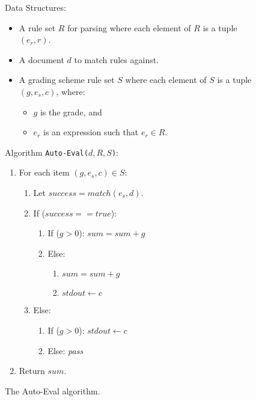 \begin{figure}[tr]
\begin{framed}
Data Structures:
\begin{itemize}
  \item A rule set $R$ for parsing where each element of $R$ is a tuple $(e_r, r)$.
  \item A document $d$ to match rules against.
  \item A grading scheme rule set $S$ where each element of $S$ is a tuple $(g, e_s, c)$, where:
    \begin{itemize}
      \item $g$ is the grade, and
      \item $e_r$ is an expression such that $e_r \in R$.
    \end{itemize}
\end{itemize}

Algorithm \texttt{Auto-Eval($d, R, S$)}:
\begin{enumerate}
 \item For each item $(g, e_s, c) \in S$:
  \begin{enumerate}
    \item Let $success = match(e_s, d)$.
    \item If ($success == true$):
    \begin{enumerate}
      \item If ($g > 0$): $sum = sum + g$
      \item Else: 
	\begin{enumerate}
	  \item $sum = sum + g$ 
	  \item $stdout \leftarrow c$
	\end{enumerate}
    \end{enumerate}
    \item Else:
    \begin{enumerate}
      \item If ($g > 0$): $stdout \leftarrow c$
      \item Else:         \emph{pass}
    \end{enumerate}
  \end{enumerate}
  \item Return $sum$.
\end{enumerate}
\end{framed}
\caption{The Auto-Eval algorithm.}
\label{alg:autoeval}
\end{figure}

